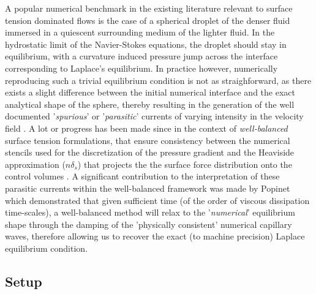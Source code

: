 A popular numerical benchmark in the existing literature relevant to surface tension dominated flows is the case of a spherical droplet of the denser fluid immersed in a quiescent surrounding medium of the lighter fluid. In the hydrostatic limit of the Navier-Stokes equations, the droplet should stay in equilibrium, with a curvature induced pressure jump across the interface corresponding to Laplace's equilibrium. In practice however, numerically reproducing such a trivial equilibrium condition is not as straighforward, as there exists a slight difference between the initial numerical interface and the exact analytical shape of the sphere, thereby resulting in the generation of the well documented '\textit{spurious}' or '\textit{parasitic}' currents of varying intensity in the velocity field . A lot or progress has been made since in the context of \textit{well-balanced} surface tension formulations, that ensure consistency between the numerical stencils used for the discretization of the pressure gradient and the Heaviside approximation ($n \delta_{s}$) that projects the the surface force distribution onto the control volumes \cite{francois2006balanced,popinet2009accurate}. A significant contribution to the interpretation of these parasitic currents within the well-balanced framework was made by Popinet \cite{popinet2009accurate} which demonstrated that given sufficient time (of the order of viscous dissipation time-scales), a well-balanced method will relax to the '\textit{numerical}' equilibrium shape through the damping of the 'physically consistent' numerical capillary waves, therefore allowing us to recover the exact (to machine precision) Laplace equilibrium condition.

\subsection*{Setup}


